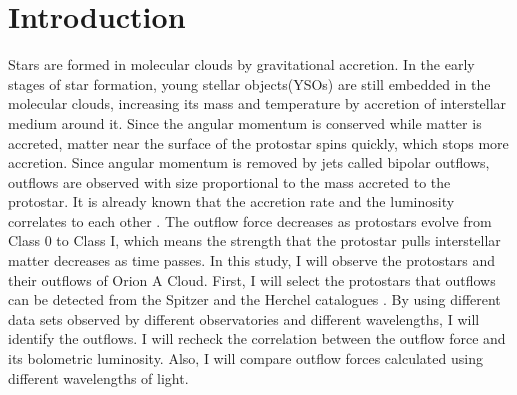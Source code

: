 \documentclass[twoside,11pt]{gshs_thesis}
\begin{document}
\cleardoublepage
\clearpage
\listoffigures	%

\cleardoublepage
\clearpage
\listoftables  %


\cleardoublepage
\clearpage
\renewcommand{\thepage}{\arabic{page}}
\setcounter{page}{1}



\section{Introduction}

Stars are formed in molecular clouds by gravitational accretion. In the early stages of star formation, young stellar objects(YSOs) are still embedded in the molecular clouds, increasing its mass and temperature by accretion of interstellar medium around it. Since the angular momentum is conserved while matter is accreted, matter near the surface of the protostar spins quickly, which stops more accretion. Since angular momentum is removed by jets called bipolar outflows, outflows are observed with size proportional to the mass accreted to the protostar\cite{Bontemps}. 
It is already known that the accretion rate and the luminosity correlates to each other \cite{Kang}. The outflow force decreases as protostars evolve from Class 0 to Class I, which means the strength that the protostar pulls interstellar matter decreases as time passes. 
In this study, I will observe the protostars and their outflows of Orion A Cloud. First, I will select the protostars that outflows can be detected from the Spitzer and the Herchel catalogues \cite{Spitzer, HerschelFurlan}. By using different data sets observed by different observatories and different wavelengths, I will identify the outflows. I will recheck the correlation between the outflow force and its bolometric luminosity. Also, I will compare outflow forces calculated using different wavelengths of light. 
\end{document}
